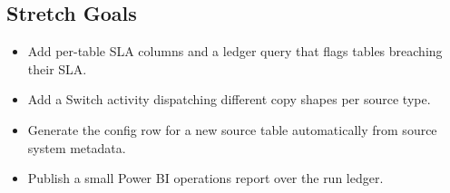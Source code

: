 \subsection*{Stretch Goals}
\begin{itemize}
    \item Add per-table SLA columns and a ledger query that flags tables breaching their SLA.
    \item Add a Switch activity dispatching different copy shapes per source type.
    \item Generate the config row for a new source table automatically from source system metadata.
    \item Publish a small Power BI operations report over the run ledger.
\end{itemize}
